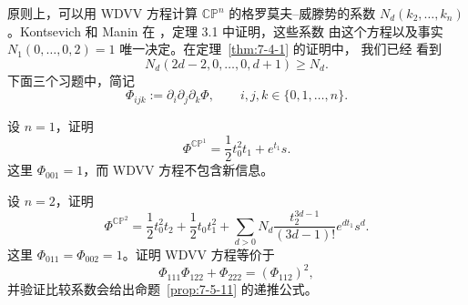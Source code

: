 原则上，可以用 WDVV 方程计算 $\mathbb{CP}^n$ 的格罗莫夫--威滕势的系数
$N_d(k_2,\ldots,k_n)$。Kontsevich 和 Manin 在 ，定理 3.1 中证明，这些系数
由这个方程以及事实 $N_1(0,\ldots,0,2)=1$ 唯一决定。在定理~\ref{thm:7-4-1} 的证明中，
我们已经
看到
\[
  N_d(2d-2,0,\ldots,0,d+1)\ge N_d.
\]
下面三个习题中，简记
\[
  \Phi_{ijk}:=\partial_i\partial_j\partial_k\Phi,
  \qquad i,j,k\in\{0,1,\ldots,n\}.
\]

\begin{exercise}\label{ex:7-5-15}
设 $n=1$，证明
\[
  \Phi^{\mathbb{CP}^1}=\frac12t_0^2t_1+e^{t_1}s.
\]
这里 $\Phi_{001}=1$，而 WDVV 方程不包含新信息。
\end{exercise}

\begin{exercise}\label{ex:7-5-16}
设 $n=2$，证明
\[
  \Phi^{\mathbb{CP}^2}
  =\frac12t_0^2t_2+\frac12t_0t_1^2
   +\sum_{d>0}N_d\frac{t_2^{3d-1}}{(3d-1)!}e^{dt_1}s^d.
\]
这里 $\Phi_{011}=\Phi_{002}=1$。证明 WDVV 方程等价于
\[
  \Phi_{111}\Phi_{122}+\Phi_{222}=(\Phi_{112})^2,
\]
并验证比较系数会给出命题~\ref{prop:7-5-11} 的递推公式。
\end{exercise}


